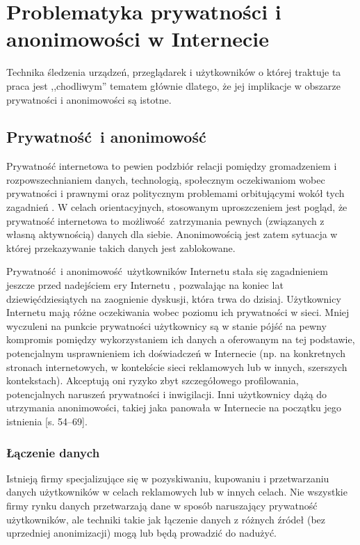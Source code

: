 \chapter{Problematyka prywatności i anonimowości w Internecie}
Technika śledzenia urządzeń, przeglądarek i użytkowników o której traktuje ta
praca jest ,,chodliwym'' tematem głównie dlatego, że jej implikacje w obszarze
prywatności i anonimowości są istotne.

\section{Prywatność i anonimowość}
Prywatność internetowa to pewien podzbiór relacji pomiędzy gromadzeniem i
rozpowszechnianiem danych, technologią, społecznym oczekiwaniom wobec
prywatności i prawnymi oraz politycznym problemami orbitującymi wokół tych
zagadnień \cite{michael2014uberveillance}. W celach orientacyjnych, stosowanym
uproszczeniem jest pogląd, że prywatność internetowa to możliwość zatrzymania
pewnych (związanych z własną aktywnością) danych dla siebie. Anonimowością jest
zatem sytuacja w której przekazywanie takich danych jest zablokowane.

Prywatność i anonimowość użytkowników Internetu stała się zagadnieniem jeszcze
przed nadejściem ery Internetu \cite{david1965some}, pozwalając na koniec lat
dziewięćdziesiątych na zaognienie dyskusji, która trwa do dzisiaj. Użytkownicy
Internetu mają różne oczekiwania wobec poziomu ich prywatności w sieci. Mniej
wyczuleni na punkcie prywatności użytkownicy są w stanie pójść na pewny
kompromis pomiędzy wykorzystaniem ich danych a oferowanym na tej podstawie,
potencjalnym usprawnieniem ich doświadczeń w Internecie (np. na konkretnych
stronach internetowych, w kontekście sieci reklamowych lub w innych, szerszych
kontekstach). Akceptują oni ryzyko zbyt szczegółowego profilowania,
potencjalnych naruszeń prywatności i inwigilacji. Inni użytkownicy dążą do
utrzymania anonimowości, takiej jaka panowała w Internecie na początku jego
istnienia \cite{snowden2019pamiec}[s. 54--69].

\subsection{Łączenie danych}
Istnieją firmy specjalizujące się w pozyskiwaniu, kupowaniu i przetwarzaniu
danych użytkowników w celach reklamowych lub w innych celach. Nie wszystkie
firmy rynku danych przetwarzają dane w sposób naruszający prywatność
użytkowników, ale techniki takie jak łączenie danych z różnych źródeł (bez
uprzedniej anonimizacji) mogą lub będą prowadzić do nadużyć.

